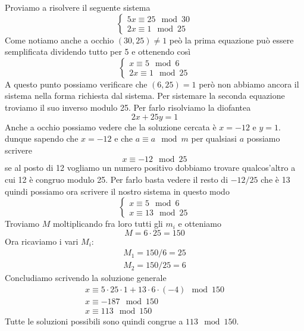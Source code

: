 \begin{example}
	Proviamo a risolvere il seguente sistema
	\begin{equation*}
		\begin{cases}
			5x \equiv 25 \mod{30} \\
			2x \equiv 1 \mod{25}
		\end{cases}
	\end{equation*}
	Come notiamo anche a occhio $(30, 25) \neq 1$ pe\`o la prima equazione pu\`o essere
	semplificata dividendo tutto per 5 e ottenendo cos\`i
	\begin{equation*}
		\begin{cases}
			x \equiv 5 \mod{6} \\
			2x \equiv 1 \mod{25}
		\end{cases}
	\end{equation*}
	A questo punto possiamo verificare che $(6, 25) = 1$ per\`o non abbiamo ancora il sistema
	nella forma richiesta dal sistema. Per sistemare la seconda equazione troviamo il suo
	inverso modulo 25. Per farlo risolviamo la diofantea
	\begin{equation*}
		2x + 25y = 1
	\end{equation*}
	Anche a occhio possiamo vedere che la soluzione cercata \`e $x = -12$ e $y = 1$.
	dunque sapendo che $x = -12$ e che $a \equiv a \mod{m}$ per qualsiasi $a$ possiamo scrivere
	\begin{equation*}
		x \equiv -12 \mod{25}
	\end{equation*}
	se al posto di 12 vogliamo un numero positivo dobbiamo trovare qualcos'altro a cui 12 \`e
	congruo modulo 25. Per farlo basta vedere il resto di $-12 / 25$ che \`e 13 quindi
	possiamo ora scrivere il nostro sistema in questo modo
	\begin{equation*}
		\begin{cases}
			x \equiv 5 \mod{6} \\
			x \equiv 13 \mod{25}
		\end{cases}
	\end{equation*}
	Troviamo $M$ moltiplicando fra loro tutti gli $m_i$ e otteniamo
	\begin{equation*}
		M = 6 \cdot 25 = 150
	\end{equation*}
	Ora ricaviamo i vari $M_i$:
	\begin{equation*}
		\begin{array}{l}
			M_1 = 150 / 6 = 25 \\
			M_2 = 150 / 25 = 6
		\end{array}
	\end{equation*}
	Concludiamo scrivendo la soluzione generale
	\begin{equation*}
		\begin{array}{l}
			x \equiv 5 \cdot 25 \cdot 1 + 13 \cdot 6 \cdot (-4) \mod{150} \\
			x \equiv -187 \mod{150}                                       \\
			x \equiv 113 \mod{150}
		\end{array}
	\end{equation*}
	Tutte le soluzioni possibili sono quindi congrue a $113 \mod{150}$.
\end{example}

